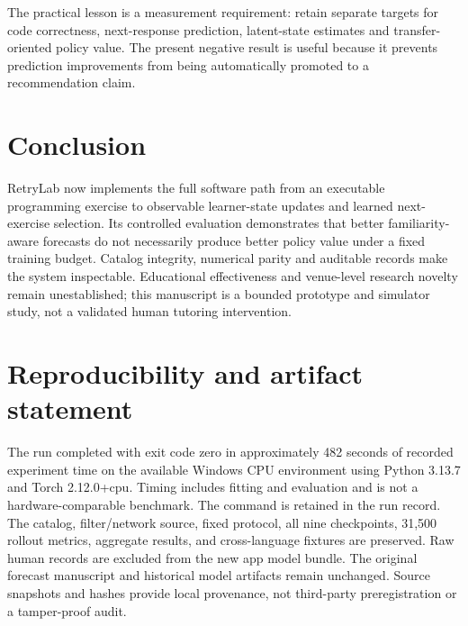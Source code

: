 \documentclass[11pt,a4paper]{article}
\begin{document}
The practical lesson is a measurement requirement: retain separate targets for code correctness, next-response prediction, latent-state estimates and transfer-oriented policy value. The present negative result is useful because it prevents prediction improvements from being automatically promoted to a recommendation claim.

\section{Conclusion}
RetryLab now implements the full software path from an executable programming exercise to observable learner-state updates and learned next-exercise selection. Its controlled evaluation demonstrates that better familiarity-aware forecasts do not necessarily produce better policy value under a fixed training budget. Catalog integrity, numerical parity and auditable records make the system inspectable. Educational effectiveness and venue-level research novelty remain unestablished; this manuscript is a bounded prototype and simulator study, not a validated human tutoring intervention.

\section*{Reproducibility and artifact statement}
The run completed with exit code zero in approximately 482 seconds of recorded experiment time on the available Windows CPU environment using Python 3.13.7 and Torch 2.12.0+cpu. Timing includes fitting and evaluation and is not a hardware-comparable benchmark. The command is retained in the run record. The catalog, filter/network source, fixed protocol, all nine checkpoints, 31,500 rollout metrics, aggregate results, and cross-language fixtures are preserved. Raw human records are excluded from the new app model bundle. The original forecast manuscript and historical model artifacts remain unchanged. Source snapshots and hashes provide local provenance, not third-party preregistration or a tamper-proof audit.
\end{document}
